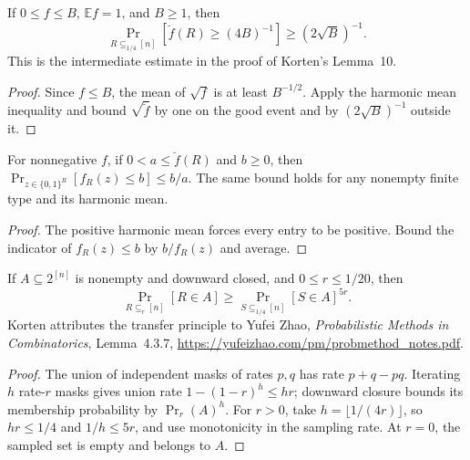 \begin{theorem}
  \label{thm:analysis-harmonic-good-probability}
  \leanok
  If $0\le f\le B$, $\mathbb{E}f=1$, and $B\ge1$, then
  \[
    \Pr_{R\subseteq_{1/4}[n]}[\breve f(R)\ge(4B)^{-1}]
      \ge (2\sqrt B)^{-1}.
  \]
  This is the intermediate estimate in the proof of Korten's Lemma~10.
\end{theorem}
\begin{proof}
  \leanok
  Since $f\le B$, the mean of $\sqrt f$ is at least $B^{-1/2}$.
  Apply the harmonic mean inequality and bound $\sqrt{\breve f}$ by one
  on the good event and by $(2\sqrt B)^{-1}$ outside it.
\end{proof}

\begin{theorem}
  \label{thm:analysis-harmonic-light-fraction}
  \leanok
  For nonnegative $f$, if $0<a\le\breve f(R)$ and $b\ge0$, then
  $\Pr_{z\in\{0,1\}^R}[f_R(z)\le b]\le b/a$.
  The same bound holds for any nonempty finite type and its harmonic mean.
\end{theorem}
\begin{proof}
  \leanok
  The positive harmonic mean forces every entry to be positive.
  Bound the indicator of $f_R(z)\le b$ by $b/f_R(z)$ and average.
\end{proof}

\begin{theorem}
  \label{thm:analysis-bernoulli-transference}
  \leanok
  If $A\subseteq2^{[n]}$ is nonempty and downward closed, and
  $0\le r\le1/20$, then
  \[
    \Pr_{R\subseteq_r[n]}[R\in A]
      \ge \Pr_{S\subseteq_{1/4}[n]}[S\in A]^{5r}.
  \]
  Korten attributes the transfer principle to Yufei Zhao,
  \emph{Probabilistic Methods in Combinatorics}, Lemma~4.3.7,
  \url{https://yufeizhao.com/pm/probmethod_notes.pdf}.
\end{theorem}
\begin{proof}
  \leanok
  The union of independent masks of rates $p,q$ has rate $p+q-pq$.
  Iterating $h$ rate-$r$ masks gives union rate $1-(1-r)^h\le hr$;
  downward closure bounds its membership probability by $\Pr_r(A)^h$.
  For $r>0$, take $h=\lfloor1/(4r)\rfloor$, so $hr\le1/4$ and
  $1/h\le5r$, and use monotonicity in the sampling rate. At $r=0$,
  the sampled set is empty and belongs to $A$.
\end{proof}

